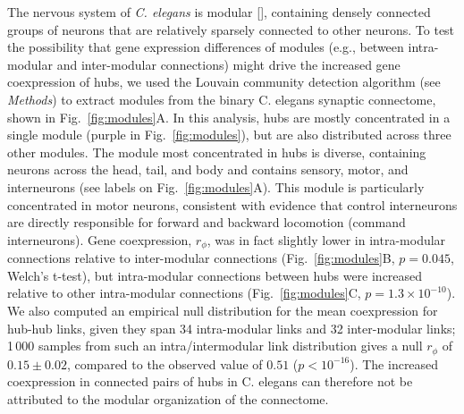 \documentclass[10pt,letterpaper]{article}
\begin{document}

The nervous system of \emph{C. elegans} is modular [\cite{Kim2014a,Bassett2010a,Pavlovic2014  }], containing densely connected groups of neurons that are relatively sparsely connected to other neurons.
To test the possibility that gene expression differences of modules (e.g., between intra-modular and inter-modular connections) might drive the increased gene coexpression of hubs, we used the Louvain community detection algorithm (see \textit{Methods}) to extract modules from the binary C. elegans synaptic connectome, shown in Fig.~\ref{fig:modules}A.
In this analysis, hubs are mostly concentrated in a single module (purple in Fig.~\ref{fig:modules}), but are also distributed across three other modules.
The module most concentrated in hubs is diverse, containing neurons across the head, tail, and body and contains sensory, motor, and interneurons (see labels on Fig.~\ref{fig:modules}A).
This module is particularly concentrated in motor neurons, consistent with evidence that control interneurons are directly responsible for forward and backward locomotion (command interneurons).
Gene coexpression, $r_\phi$, was in fact slightly lower in intra-modular connections relative to inter-modular connections (Fig.~\ref{fig:modules}B, $p = 0.045$, Welch's t-test), but intra-modular connections between hubs were increased relative to other intra-modular connections (Fig.~\ref{fig:modules}C, $p = 1.3\times 10^{-10}$).
We also computed an empirical null distribution for the mean coexpression for hub-hub links, given they span 34 intra-modular links and 32 inter-modular links; 1\,000 samples from such an intra/intermodular link distribution gives a null $r_\phi$ of $0.15 \pm 0.02$, compared to the observed value of $0.51$ ($p < 10^{-16}$).
The increased coexpression in connected pairs of hubs in C. elegans can therefore not be attributed to the modular organization of the connectome.
\end{document}
